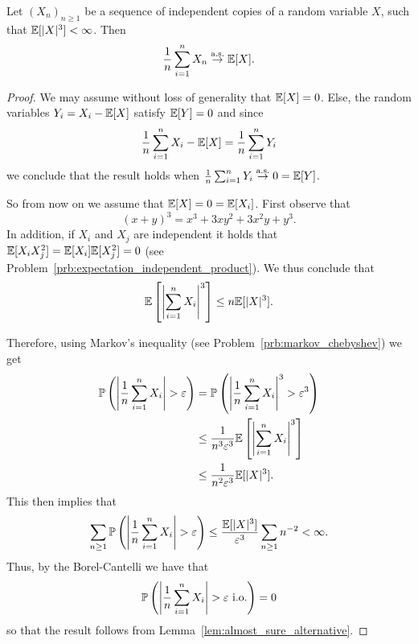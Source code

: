 \begin{theorem}\label{thm:slln_weaker}
Let $(X_n)_{n \ge 1}$ be a sequence of independent copies of a random variable $X$, such that $\mathbb E[|X|^3] < \infty$. Then
\[
	\frac{1}{n} \sum_{i = 1}^n X_n \stackrel{\mathrm{a.s.}}{\rightarrow} \mathbb E[X].
\]
\end{theorem}

\begin{proof}
We may assume without loss of generality that $\mathbb E[X] = 0$. Else, the random variables $Y_i = X_i - \mathbb E[X]$ satisfy $\mathbb E[Y] = 0$ and since
\[
	\frac{1}{n} \sum_{i = 1}^n X_i - \mathbb E[X] = \frac{1}{n} \sum_{i = 1}^n Y_i
\]
we conclude that the result holds when $\frac{1}{n} \sum_{i = 1}^n Y_i \stackrel{\mathrm{a.s.}}{\rightarrow} 0 = \mathbb E[Y]$.

So from now on we assume that $\mathbb E[X] = 0 = \mathbb E[X_i]$. First observe that
\[
	(x+y)^3 = x^3 +3xy^2 + 3x^2 y + y^3.
\]
In addition, if $X_i$ and $X_j$ are independent it holds that $\mathbb E[X_i X_j^2] = \mathbb E[X_i] \mathbb E[X_j^2] = 0$ (see Problem~\ref{prb:expectation_independent_product}). We thus conclude that
\[
	\mathbb E\left[\left|\sum_{i = 1}^n X_i\right|^3\right] \le n \mathbb E[|X|^3].
\]

Therefore, using Markov's inequality (see Problem~\ref{prb:markov_chebyshev}) we get
\begin{align*}
	\mathbb P\left(\left|\frac{1}{n} \sum_{i = 1}^n X_i\right| > \varepsilon\right)
	&= \mathbb P\left(\left|\frac{1}{n} \sum_{i = 1}^n X_i\right|^3 > \varepsilon^3\right)\\
	&\le \frac{1}{n^3 \varepsilon^3} \mathbb E\left[\left|\sum_{i = 1}^n X_i\right|^3\right]\\
	&\le \frac{1}{n^2 \varepsilon^3} \mathbb E[|X|^3].
\end{align*}
This then implies that
\[
	\sum_{n \ge 1} \mathbb P\left(\left|\frac{1}{n} \sum_{i = 1}^n X_i\right| > \varepsilon\right) 
	\le \frac{\mathbb E[|X|^3]}{\varepsilon^3}\sum_{n \ge 1} n^{-2} < \infty.
\]
Thus, by the Borel-Cantelli we have that
\[
	\mathbb P\left(\left|\frac{1}{n} \sum_{i = 1}^n X_i\right| > \varepsilon \text{ i.o.}\right) = 0 
\]
so that the result follows from Lemma~\ref{lem:almost_sure_alternative}.
\end{proof}


